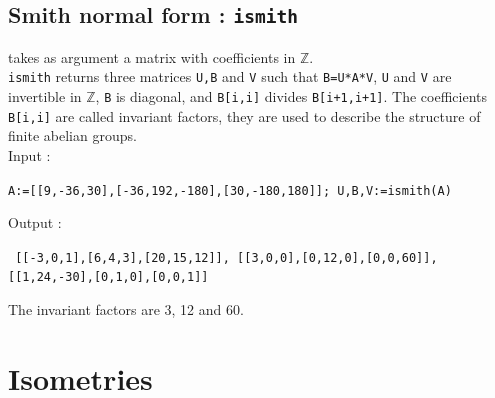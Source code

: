 \documentclass[a4paper,11pt]{book}
\begin{document}
\subsection{Smith normal form : {\tt ismith}}
 takes as argument a matrix with coefficients in
$\mathbb Z$.\\
{\tt ismith} returns three matrices {\tt U,B} and {\tt V} such 
that {\tt B=U*A*V}, {\tt U} and {\tt V} are invertible in  $\mathbb Z$, 
{\tt B} is diagonal, and {\tt B[i,i]} divides {\tt B[i+1,i+1]}.
The coefficients {\tt B[i,i]} are called 
invariant factors, they are used to describe
the structure of finite abelian groups.\\
Input :
\begin{center}
{\tt A:=[[9,-36,30],[-36,192,-180],[30,-180,180]]; 
U,B,V:=ismith(A)}
\end{center}
Output :
\begin{center}{\tt
[[-3,0,1],[6,4,3],[20,15,12]],
[[3,0,0],[0,12,0],[0,0,60]], 
[[1,24,-30],[0,1,0],[0,0,1]] }
\end{center}
The invariant factors are 3, 12 and 60.

\section{Isometries}
\end{document}
